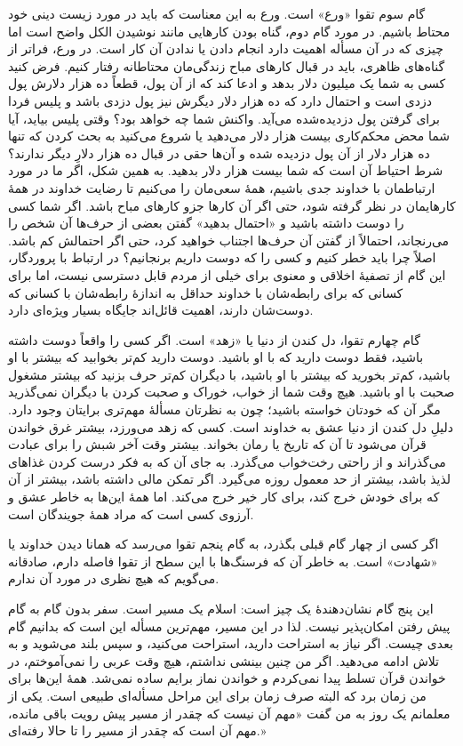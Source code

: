 گام سوم تقوا «ورع» است. ورع به این معناست که باید در مورد زیست دینی خود محتاط باشیم. در مورد گام دوم، گناه بودن کارهایی مانند نوشیدن الکل واضح است اما چیزی که در آن مسأله اهمیت دارد انجام دادن یا ندادن آن کار است. در ورع، فراتر از گناه‌های ظاهری، باید در قبال  کارهای مباح زندگی‌مان محتاطانه رفتار کنیم. فرض کنید کسی به شما یک میلیون دلار بدهد و ادعا کند که از آن پول، قطعاً ده هزار دلارش پول دزدی است و احتمال دارد که ده هزار دلار دیگرش نیز پول دزدی باشد و پلیس فردا برای گرفتن پول دزدیده‌شده می‌آید. واکنش شما چه خواهد بود؟ وقتی پلیس بیاید، آیا شما محض محکم‌کاری بیست هزار دلار می‌دهید یا شروع می‌کنید به بحث کردن که تنها ده هزار دلار از آن پول دزدیده شده و آن‌ها حقی در قبال ده هزار دلارِ دیگر ندارند؟ شرط احتیاط آن است که شما بیست هزار دلار بدهید. به همین شکل، اگر ما در مورد ارتباطمان با خداوند جدی باشیم، همهٔ سعی‌مان را می‌کنیم تا رضایت خداوند در همهٔ کارهایمان در نظر گرفته شود، حتی اگر آن کارها جزو کارهای مباح باشد. اگر شما کسی را دوست داشته باشید و «احتمال بدهید» گفتن بعضی از حرف‌ها آن شخص را می‌رنجاند، احتمالاً از گفتن آن حرف‌ها اجتناب خواهید کرد، حتی اگر احتمالش کم باشد. اصلاً چرا باید خطر کنیم و کسی را که دوست داریم برنجانیم؟ در ارتباط با پروردگار، این گام از تصفیهٔ اخلاقی و معنوی برای خیلی از مردم قابل دسترسی نیست، اما برای کسانی که برای  رابطه‌شان با خداوند حداقل به اندازهٔ رابطه‌شان با کسانی که دوست‌شان دارند، اهمیت قائل‌اند جایگاه بسیار ویژه‌ای دارد.

گام چهارم تقوا، دل کندن از دنیا یا «زهد» است. اگر کسی را واقعاً دوست داشته باشید، فقط دوست دارید که با او باشید. دوست دارید کم‌تر بخوابید که بیشتر با او باشید، کم‌تر بخورید که بیشتر با او باشید، با دیگران کم‌تر حرف بزنید که بیشتر مشغول صحبت با او باشید. هیچ وقت شما از خواب، خوراک و صحبت کردن‌ با دیگران نمی‌گذرید مگر آن که خودتان خواسته باشید؛ چون به نظرتان مسألهٔ مهم‌تری برایتان وجود دارد. دلیلِ دل کندن از دنیا عشق به خداوند است. کسی که زهد می‌ورزد، بیشتر غرق خواندن قرآن می‌شود تا آن که تاریخ یا رمان بخواند. بیشتر وقت آخر شبش را برای عبادت می‌گذراند و از راحتی رخت‌خواب می‌گذرد. به جای آن که به فکر درست کردن غذاهای لذیذ باشد، بیشتر از حد معمول روزه می‌گیرد. اگر تمکن مالی داشته باشد، بیشتر از آن که برای خودش خرج کند، برای کار خیر خرج می‌کند. اما همهٔ این‌ها به خاطر عشق و آرزوی کسی است که مراد همهٔ جویندگان است.

اگر کسی از چهار گام قبلی بگذرد، به گام پنجم تقوا می‌رسد که همانا دیدن خداوند یا «شهادت» است. به خاطر آن که فرسنگ‌ها با این سطح از تقوا فاصله دارم، صادقانه می‌گویم که هیچ نظری در مورد آن ندارم. 

این پنج گام نشان‌دهندهٔ یک چیز است: اسلام یک مسیر است. سفر بدون گام به گام پیش رفتن امکان‌پذیر نیست. لذا در این مسیر، مهم‌ترین مسأله این است که  بدانیم گام بعدی چیست. اگر نیاز به استراحت دارید،‌ استراحت می‌کنید، و سپس بلند می‌شوید و به تلاش ادامه می‌دهید. اگر من چنین بینشی نداشتم، هیچ وقت عربی را نمی‌آموختم، در خواندن قرآن تسلط پیدا نمی‌کردم و خواندن نماز برایم ساده نمی‌شد. همهٔ این‌ها برای من زمان برد که البته صرف زمان برای این مراحل مسأله‌ای طبیعی است. یکی از معلمانم یک روز به من گفت «مهم آن نیست که چقدر از مسیر پیش رویت باقی مانده، مهم آن است که چقدر از مسیر را تا حالا رفته‌ای.»









